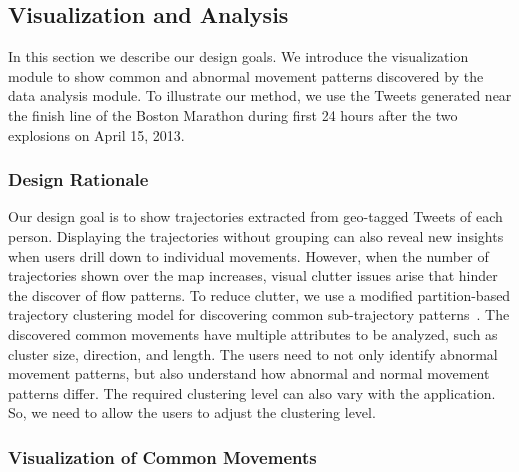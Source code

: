 \subsection{Visualization and Analysis}
\label{sec:visualization}
In this section we describe our design goals.
We introduce the visualization module to show common and abnormal movement patterns discovered by the data analysis module.
To illustrate our method, we use the Tweets generated near the finish line of the Boston Marathon during first 24 hours after the two explosions on April 15, 2013.

\subsubsection{Design Rationale}
Our design goal is to show trajectories extracted from geo-tagged Tweets of each person.
Displaying the trajectories without grouping can also reveal new insights when users drill down to individual movements.
However, when the number of trajectories shown over the map increases, visual clutter issues arise that hinder the discover of flow patterns.
To reduce clutter, we use a modified partition-based trajectory clustering model for discovering common sub-trajectory patterns~\cite{Lee:2007:Trajectory}.
The discovered common movements have multiple attributes to be analyzed, such as cluster size, direction, and length.
The users need to not only identify abnormal movement patterns, but also understand how abnormal and normal movement patterns differ.
The required clustering level can also vary with the application.
So, we need to allow the users to adjust the clustering level.

\subsubsection{Visualization of Common Movements}

